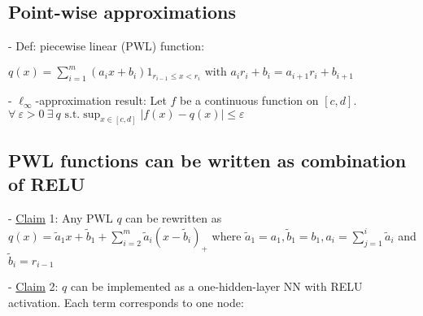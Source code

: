 

\subsection*{Point-wise approximations}
- Def: piecewise linear (PWL) function:

$
q(x)=\sum_{i=1}^{m}\left(a_{i} x+b_{i}\right) 1_{r_{i-1} \leq x<r_{i}} \text { with } a_{i} r_{i}+b_{i}=a_{i+1} r_{i}+b_{i+1}
$

- $\ell_{\infty}$-approximation result: Let $f$ be a continuous function on $[c, d]$. $\forall \ \varepsilon>0 \ \exists \ q \text{ s.t.}
\sup _{x \in[c, d]}|f(x)-q(x)| \leq \varepsilon
$






\subsection*{PWL functions can be written as combination of RELU}
- \underline{Claim} 1: Any PWL $q$ can be rewritten as
$
q(x)=\tilde{a}_{1} x+\tilde{b}_{1}+\sum_{i=2}^{m} \tilde{a}_{i}\left(x-\tilde{b}_{i}\right)_{+}
$
where $\tilde{a}_{1}=a_{1}, \tilde{b}_{1}=b_{1}, a_{i}=\sum_{j=1}^{i} \tilde{a}_{i}$ and $\tilde{b}_{i}=r_{i-1}$

- \underline{Claim} 2: $q$ can be implemented as a one-hidden-layer NN with RELU activation. Each term corresponds to one node:



